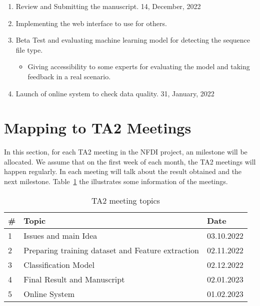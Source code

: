 \documentclass[a4paper]{article}
\newcommand{\deadline}[1]{{\color{blue} \hfill{#1} }}
\begin{document}
\begin{enumerate}
        \item Review and Submitting the manuscript.\deadline{14, December, 2022}
        \item Implementing the web interface to use for others.
        \item Beta Test and evaluating machine learning model for detecting the sequence file type.
        \begin{itemize}
            \item Giving accessibility to some experts for evaluating the model and taking feedback in a real scenario.
        \end{itemize}
        \item Launch of online system to check data quality. \deadline{31, January, 2022}

    \end{enumerate}

    \section{Mapping to TA2 Meetings}\label{sec:ta2}
    In this section, for each TA2 meeting in the NFDI project, an milestone will be allocated.
    We assume that on the first week of each month, the TA2 meetings will happen regularly.
    In each meeting will talk about the result obtained and the next milestone.
    Table~\ref{tab:ta2} the illustrates some information of the meetings.
    \begin{table}[h]\label{tab:ta2}
        \centering
        \caption{TA2 meeting topics}
        \begin{tabular}{lll}
            \# & Topic                                             & Date       \\ \hline
            1  & Issues and main Idea                              & 03.10.2022 \\
            2  & Preparing training dataset and Feature extraction & 02.11.2022 \\
            3  & Classification Model                              & 02.12.2022 \\
            4  & Final Result and Manuscript                       & 02.01.2023 \\
            5  & Online System                                     & 01.02.2023 \\ \hline
        \end{tabular}
    \end{table}

    
    
\end{document}
